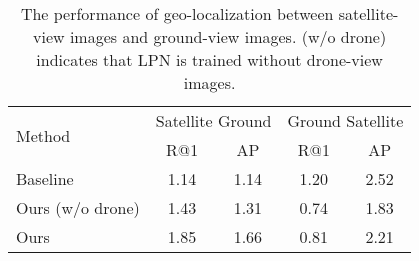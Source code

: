 \documentclass[journal]{IEEEtran}
\begin{document}
\setlength{\tabcolsep}{6pt}
\begin{table}
\small
\caption{The performance of geo-localization between satellite-view images and ground-view images. (w/o drone) indicates that LPN is trained without drone-view images.
}
\begin{center}
\begin{tabular}{l|cc|cc}
\hline
\multirow{2}{*}{Method}& \multicolumn{2}{c|}{Satellite  Ground} & \multicolumn{2}{c}{Ground  Satellite}\\
  & R@1 & AP & R@1 & AP\\
\shline
Baseline~\cite{zheng_university-1652_nodate} & 1.14 & 1.14 & 1.20 & 2.52\\
Ours (w/o drone) & 1.43 & 1.31 & 0.74 & 1.83 \\
Ours & 1.85 & 1.66 & 0.81 & 2.21 \\
\hline
\end{tabular}
\end{center}
\label{table:ground}
\end{table}
\end{document}
